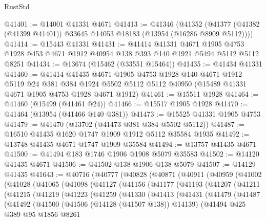 \begin{lexlean}{RustStd}
\begin{coremodule}
@41401 := @14001 @41331 @4671
@41413 := @41346
    (@41352 (@41377 (@41382 (@41399 @41401)) @33645 @14053 @18183 (@13954 (@16286 @8909 @5112))))
@41414 := @15443 @41331
@41431 := @41414
    @41331
    @4671
    @1905
    @4753
    @1928
    @453
    @4671
    @1912
    @40954
    @138
    @393
    @140
    @1921
    @5494
    @5112
    @5112
    @8251
@41434 := @13674 (@15462 (@33551 @15464))
@41435 := @41434 @41331
@41460 := @41414
    @41435
    @4671
    @1905
    @4753
    @1928
    @140
    @4671
    @1912
    @5119
    @24
    @381
    @384
    @1924
    @5502
    @5112
    @5112
    @40950
    (@15489 @41331 @4671 @1905 @4753 @1928 @4671 @1912)
@41461 := @15511 @1928
@41464 := @41460 (@15499 (@41461 @24))
@41466 := @15517 @1905 @1928
@41470 := @41464 (@13954 (@41466 @140 @381))
@41473 := @15525 @41331 @1905 @4753
@41479 := @41470 (@13702 (@41473 @381 @384 @5502 @5112))
@41487 := @16510 @41435 @1620 @1747 @1909 @1912 @5112 @35584 @1935
@41492 := @13748 @41435 @4671 @1747 @1909 @35584
@41494 := @13757 @41435 @4671
@41500 := @41494 @183 @1746 @1906 @1908 @5079 @35583
@41502 := @14120 @41435 @4671
@41506 := @41502 @138 @1906 @138 @5079
@41507 := @14129 @41435
@41643 := @40716
    (@40777
      (@40828
        (@40871
          (@40911
            (@40959
              (@41002
                (@41028
                  (@41065
                    (@41098
                      (@41127
                        (@41156
                          (@41177
                            (@41193
                              (@41207
                                (@41211
                                  (@41215
                                    (@41219
                                      (@41223
                                        (@41259
                                          (@41330
                                            (@41413
                                              (@41431
                                                (@41479
                                                  (@41487
                                                    (@41492
                                                      (@41500
                                                        (@41506 (@14128 (@41507 @138)) @14139)
                                                        (@41494
                                                          @425
                                                          @389
                                                          @95
                                                          @1856
                                                          @8261

\end{coremodule}
\end{lexlean}
